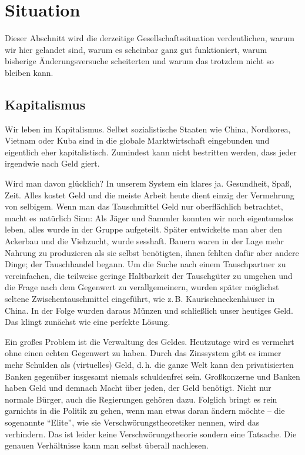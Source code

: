 \section{Situation}\label{sec:situation}

Dieser Abschnitt wird die derzeitige Gesellschaftssituation verdeutlichen, warum wir hier gelandet sind, warum es scheinbar ganz gut funktioniert, warum bisherige Änderungsversuche scheiterten und warum das trotzdem nicht so bleiben kann.

\subsection{Kapitalismus}\label{sec:situation/capitalism}

Wir leben im Kapitalismus. Selbst sozialistische Staaten wie China, Nordkorea, Vietnam oder Kuba sind in die globale Marktwirtschaft eingebunden und eigentlich eher kapitalistisch. Zumindest kann nicht bestritten werden, dass jeder irgendwie nach Geld giert.

Wird man davon glücklich? In unserem System ein klares ja. Gesundheit, Spaß, Zeit. Alles kostet Geld und die meiste Arbeit heute dient einzig der Vermehrung von selbigem. Wenn man das Tauschmittel Geld nur oberflächlich betrachtet, macht es natürlich Sinn: Als Jäger und Sammler konnten wir noch eigentumslos leben, alles wurde in der Gruppe aufgeteilt. Später entwickelte man aber den Ackerbau und die Viehzucht, wurde sesshaft. Bauern waren in der Lage mehr Nahrung zu produzieren als sie selbst benötigten, ihnen fehlten dafür aber andere Dinge; der Tauschhandel begann. Um die Suche nach einem Tauschpartner zu vereinfachen, die teilweise geringe Haltbarkeit der Tauschgüter zu umgehen und die Frage nach dem Gegenwert zu verallgemeinern, wurden später möglichst seltene Zwischentauschmittel eingeführt, wie z.\,B. Kaurischneckenhäuser in China. In der Folge wurden daraus Münzen und schließlich unser heutiges Geld. Das klingt zunächst wie eine perfekte Lösung.

Ein großes Problem ist die Verwaltung des Geldes. Heutzutage wird es vermehrt ohne einen echten Gegenwert zu haben. Durch das Zinssystem gibt es immer mehr Schulden als (virtuelles) Geld, d.\,h. die ganze Welt kann den privatisierten Banken gegenüber insgesamt niemals schuldenfrei sein. Großkonzerne und Banken haben Geld und demnach Macht über jeden, der Geld benötigt. Nicht nur normale Bürger, auch die Regierungen gehören dazu. Folglich bringt es rein garnichts in die Politik zu gehen, wenn man etwas daran ändern möchte -- die sogenannte "`Elite"', wie sie Verschwörungstheoretiker nennen, wird das verhindern. Das ist leider keine Verschwörungstheorie sondern eine Tatsache. Die genauen Verhältnisse kann man selbst überall nachlesen.

